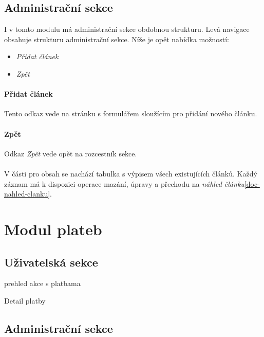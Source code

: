 \documentclass[11pt,oneside]{fithesis}
\begin{document}
            \subsection*{Administrační sekce}
            I v tomto modulu má administrační sekce obdobnou strukturu. Levá navigace obsahuje strukturu administrační sekce. Níže je opět nabídka možností:
            \begin{itemize}
                \item \textit{Přidat článek}
                \item \textit{Zpět}
            \end{itemize}
            
            \paragraph*{Přidat článek} 
            Tento odkaz vede na stránku s formulářem sloužícím pro přidání nového článku.

            \paragraph*{Zpět} 
            Odkaz \textit{Zpět} vede opět na rozcestník sekce.

            \paragraph*{}
            V části pro obsah se nachází tabulka s výpisem všech existujících článků. Každý záznam má k dispozici operace mazání, úpravy a přechodu na \textit{náhled článku}\ref{doc-nahled-clanku}.

        \section{Modul plateb}

            \subsection*{Uživatelská sekce}
            
            prehled
            akce s platbama
            
            Detail platby

            \subsection*{Administrační sekce}
\end{document}
